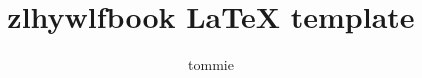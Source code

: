 \documentclass[color=red,device=normal]{zlhywlfbook}
\title{zlhywlfbook \LaTeX{} template}
\author{tommie}
\begin{document}
\maketitle

\helloworld
\end{document}
